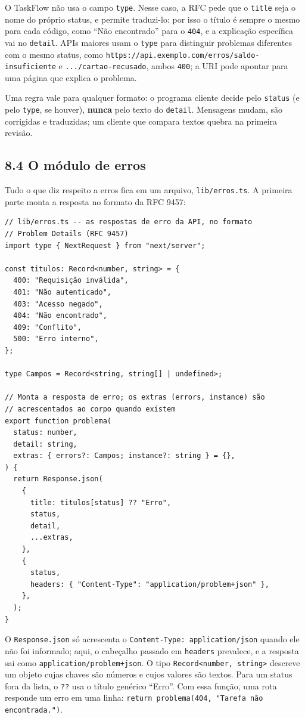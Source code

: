 O TaskFlow não usa o campo \texttt{type}. Nesse caso, a RFC pede que o \texttt{title} seja o nome do próprio status, e permite traduzi-lo: por isso o título é sempre o mesmo para cada código, como ``Não encontrado'' para o \texttt{404}, e a explicação específica vai no \texttt{detail}. APIs maiores usam o \texttt{type} para distinguir problemas diferentes com o mesmo status, como \texttt{https://api.exemplo.com/erros/saldo-insuficiente} e \texttt{.../cartao-recusado}, ambos \texttt{400}; a URI pode apontar para uma página que explica o problema.

Uma regra vale para qualquer formato: o programa cliente decide pelo \texttt{status} (e pelo \texttt{type}, se houver), \textbf{nunca} pelo texto do \texttt{detail}. Mensagens mudam, são corrigidas e traduzidas; um cliente que compara textos quebra na primeira revisão.

\subsection{8.4 O módulo de erros}

Tudo o que diz respeito a erros fica em um arquivo, \texttt{lib/erros.ts}. A primeira parte monta a resposta no formato da RFC 9457:

\begin{codigo}
\begin{Verbatim}[breaklines=true, breaksymbolleft={}, fontsize=\footnotesize]
// lib/erros.ts -- as respostas de erro da API, no formato
// Problem Details (RFC 9457)
import type { NextRequest } from "next/server";

const titulos: Record<number, string> = {
  400: "Requisição inválida",
  401: "Não autenticado",
  403: "Acesso negado",
  404: "Não encontrado",
  409: "Conflito",
  500: "Erro interno",
};

type Campos = Record<string, string[] | undefined>;

// Monta a resposta de erro; os extras (errors, instance) são
// acrescentados ao corpo quando existem
export function problema(
  status: number,
  detail: string,
  extras: { errors?: Campos; instance?: string } = {},
) {
  return Response.json(
    {
      title: titulos[status] ?? "Erro",
      status,
      detail,
      ...extras,
    },
    {
      status,
      headers: { "Content-Type": "application/problem+json" },
    },
  );
}
\end{Verbatim}
\end{codigo}

O \texttt{Response.json} só acrescenta o \texttt{Content-Type: application/json} quando ele não foi informado; aqui, o cabeçalho passado em \texttt{headers} prevalece, e a resposta sai como \texttt{application/problem+json}. O tipo \texttt{Record<number, string>} descreve um objeto cujas chaves são números e cujos valores são textos. Para um status fora da lista, o \texttt{??} usa o título genérico ``Erro''. Com essa função, uma rota responde um erro em uma linha: \texttt{return problema(404, "Tarefa não encontrada.")}.

